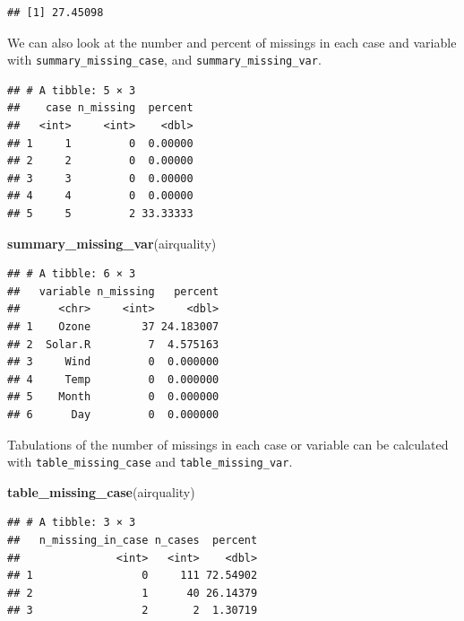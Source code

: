 \documentclass[]{article}
\newenvironment{Shaded}{\begin{snugshade}}{\end{snugshade}}
\newcommand{\KeywordTok}[1]{\textcolor[rgb]{0.13,0.29,0.53}{\textbf{{#1}}}}
\newcommand{\DecValTok}[1]{\textcolor[rgb]{0.00,0.00,0.81}{{#1}}}
\newcommand{\StringTok}[1]{\textcolor[rgb]{0.31,0.60,0.02}{{#1}}}
\newcommand{\NormalTok}[1]{{#1}}
\begin{document}
\begin{verbatim}
## [1] 27.45098
\end{verbatim}

We can also look at the number and percent of missings in each case and
variable with \texttt{summary\_missing\_case}, and
\texttt{summary\_missing\_var}.

\begin{Shaded}
\end{Shaded}

\begin{verbatim}
## # A tibble: 5 × 3
##    case n_missing  percent
##   <int>     <int>    <dbl>
## 1     1         0  0.00000
## 2     2         0  0.00000
## 3     3         0  0.00000
## 4     4         0  0.00000
## 5     5         2 33.33333
\end{verbatim}

\begin{Shaded}
\begin{Highlighting}[]
\KeywordTok{summary_missing_var}\NormalTok{(airquality)}
\end{Highlighting}
\end{Shaded}

\begin{verbatim}
## # A tibble: 6 × 3
##   variable n_missing   percent
##      <chr>     <int>     <dbl>
## 1    Ozone        37 24.183007
## 2  Solar.R         7  4.575163
## 3     Wind         0  0.000000
## 4     Temp         0  0.000000
## 5    Month         0  0.000000
## 6      Day         0  0.000000
\end{verbatim}

Tabulations of the number of missings in each case or variable can be
calculated with \texttt{table\_missing\_case} and
\texttt{table\_missing\_var}.

\begin{Shaded}
\begin{Highlighting}[]
\KeywordTok{table_missing_case}\NormalTok{(airquality)}
\end{Highlighting}
\end{Shaded}

\begin{verbatim}
## # A tibble: 3 × 3
##   n_missing_in_case n_cases  percent
##               <int>   <int>    <dbl>
## 1                 0     111 72.54902
## 2                 1      40 26.14379
## 3                 2       2  1.30719
\end{verbatim}
\end{document}

